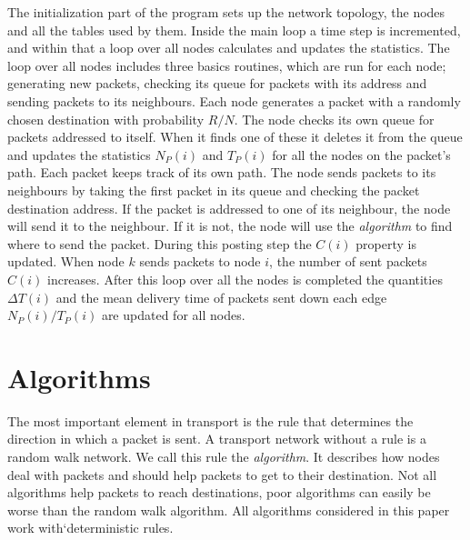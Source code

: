 \documentclass[runningheads]{llncs}
\begin{document}
The initialization part of the program sets up the network topology,
the nodes and all the tables used by them. Inside the main loop a
time step is incremented, and within that a loop over all nodes
calculates and updates the statistics. The loop over all nodes
includes three basics routines, which are run for each node;
generating new packets, checking its queue for packets with its
address and sending packets to its neighbours. Each node generates a
packet with a randomly chosen destination with probability $R/N$.
The node checks its own queue for packets addressed to itself. When
it finds one of these it deletes it from the queue and updates the
statistics $N_P(i)$ and $T_P(i)$ for all the nodes on the packet's
path. Each packet keeps track of its own path. The node sends
packets to its neighbours by taking the first packet in its queue
and checking the packet destination address. If the packet is
addressed to one of its neighbour, the node will send it to the
neighbour. If it is not, the node will use the \emph{algorithm} to
find where to send the packet. During this posting step the $C(i)$
property is updated. When node $k$ sends packets to node $i$, the
number of sent packets $C(i)$ increases. After this loop over all
the nodes is completed the quantities $\Delta T(i)$ and the mean
delivery time of packets sent down each edge $N_P(i)/T_P(i)$ are
updated for all nodes.

\section{Algorithms}
The most important element in transport is the rule that determines
the direction in which a packet is sent. A transport network without
a rule is a random walk network. We call this rule the
\emph{algorithm}. It describes how nodes deal with packets and
should help packets to get to their destination. Not all algorithms
help packets to reach destinations, poor algorithms can easily be
worse than the random walk algorithm. All algorithms considered in
this paper work with`deterministic rules.
\end{document}
